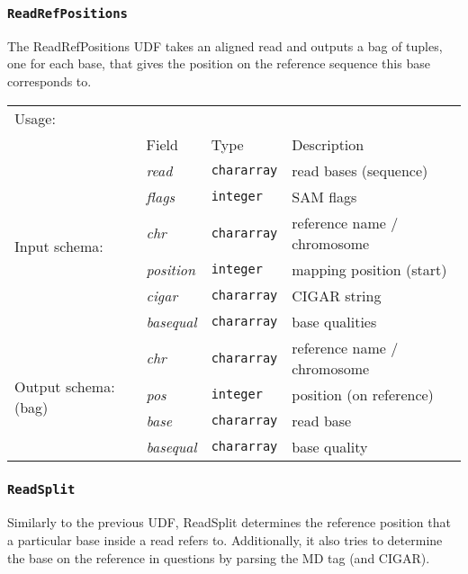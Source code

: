 \subsubsection{\texttt{ReadRefPositions}}

The ReadRefPositions UDF takes an aligned read and outputs a bag of tuples, one
for each base, that gives the position on the reference sequence this
base corresponds to.

\begin{tabular}{lp{}p{}p{}}
Usage: & \multicolumn{3}{l}{}
\hspace*{-0.55cm}\begin{minipage}{0.9\textwidth}
  \begin{lstlisting}
  reads = load 'input.bam' using BamLoader('yes');
  ref_positions = FOREACH reads GENERATE ReadRefPositions(read, flags, refname, start, cigar, basequal);
  \end{lstlisting}
  \end{minipage}\hfill\kern-\arrayrulewidth
 \\[0.25cm]
& Field & Type & Description\\[0.1cm]
\multirow{6}{*}{Input schema:} & \emph{read} & \texttt{chararray} & read bases (sequence)\\
& \emph{flags} & \texttt{integer} & SAM flags\\
& \emph{chr} & \texttt{chararray} & reference name / chromosome\\
& \emph{position} & \texttt{integer} & mapping position (start)\\
& \emph{cigar} & \texttt{chararray} & CIGAR string\\
& \emph{basequal} & \texttt{chararray} & base qualities\\\hline
\multirow{4}{*}{\parbox{2.2cm}{Output schema: (bag)}} & \emph{chr} & \texttt{chararray} & reference name / chromosome\\
& \emph{pos} & \texttt{integer} & position (on reference)\\
& \emph{base} & \texttt{chararray} & read base\\
& \emph{basequal} & \texttt{chararray} & base quality
\end{tabular}

\subsubsection{\texttt{ReadSplit}}

Similarly to the previous UDF, ReadSplit determines the reference
position that a particular base inside a read refers to. Additionally,
it also tries to determine the base on the reference in questions by
parsing the MD tag (and CIGAR).

